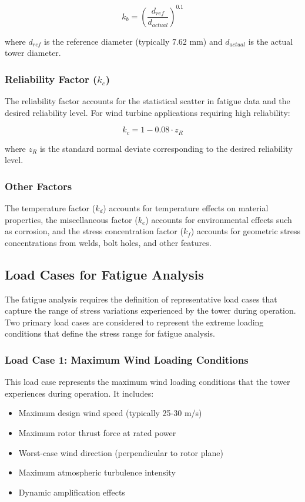 \documentclass[12pt]{article}
\begin{document}
\begin{equation}
k_b = \left(\frac{d_{ref}}{d_{actual}}\right)^{0.1}
\end{equation}

where $d_{ref}$ is the reference diameter (typically 7.62 mm) and $d_{actual}$ is the actual tower diameter.

\subsubsection{Reliability Factor ($k_c$)}

The reliability factor accounts for the statistical scatter in fatigue data and the desired reliability level. For wind turbine applications requiring high reliability:

\begin{equation}
k_c = 1 - 0.08 \cdot z_R
\end{equation}

where $z_R$ is the standard normal deviate corresponding to the desired reliability level.

\subsubsection{Other Factors}

The temperature factor ($k_d$) accounts for temperature effects on material properties, the miscellaneous factor ($k_e$) accounts for environmental effects such as corrosion, and the stress concentration factor ($k_f$) accounts for geometric stress concentrations from welds, bolt holes, and other features.

\subsection{Load Cases for Fatigue Analysis}

The fatigue analysis requires the definition of representative load cases that capture the range of stress variations experienced by the tower during operation. Two primary load cases are considered to represent the extreme loading conditions that define the stress range for fatigue analysis.

\subsubsection{Load Case 1: Maximum Wind Loading Conditions}

This load case represents the maximum wind loading conditions that the tower experiences during operation. It includes:
\begin{itemize}
    \item Maximum design wind speed (typically 25-30 m/s)
    \item Maximum rotor thrust force at rated power
    \item Worst-case wind direction (perpendicular to rotor plane)
    \item Maximum atmospheric turbulence intensity
    \item Dynamic amplification effects
\end{itemize}
\end{document}
